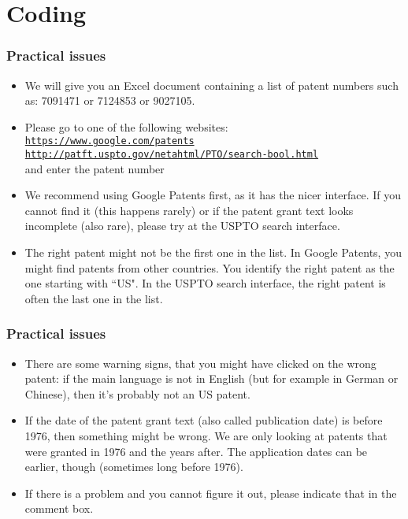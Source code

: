 \documentclass[10pt]{beamer}
\begin{document}
\section{Coding}
\setcounter{subsection}{1} %

\begin{frame}\frametitle{Practical issues}
	\begin{itemize}	
	\item We will give you an Excel document containing a list of patent numbers such as: 7091471 or 7124853 or 9027105.
	\item Please go to one of the following websites: \\[0.1cm]
 \href{https://www.google.com/patents}{\texttt{\textcolor{myred}{https://www.google.com/patents}}}\\[0.1cm]
\href{http://patft.uspto.gov/netahtml/PTO/search-bool.html}{\texttt{\textcolor{myred}{http://patft.uspto.gov/netahtml/PTO/search-bool.html}}}\\[0.1cm]
	and enter the patent number
	\item We recommend using Google Patents first, as it has the nicer interface. If you cannot find it (this happens rarely) or if the patent grant text looks incomplete (also rare), please try at the USPTO search interface.
	\item The right patent might not be the first one in the list. In Google Patents, you might find patents from other countries. You identify the right patent as the one starting with ``US". In the USPTO search interface, the right patent is often the last one in the list.
	\end{itemize}
\end{frame}

\begin{frame}\frametitle{Practical issues}
	\begin{itemize}	
	\item There are some warning signs, that you might have clicked on the wrong patent: if the main language is not in English (but for example in German or Chinese), then it's probably not an US patent.
	\item If the date of the patent grant text (also called publication date) is before 1976, then something might be wrong. We are only looking at patents that were granted in 1976 and the years after. The application dates can be earlier, though (sometimes long before 1976). 
	\item If there is a problem and you cannot figure it out, please indicate that in the comment box.
	\end{itemize}
\end{frame}
\end{document}
